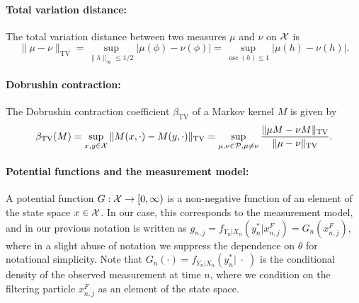 \paragraph{Total variation distance:} The total variation distance between two measures $\mu$ and $\nu$ on ${\mathcal{X}}$ is
\begin{equation}
\|\mu-\nu\|_{\mathrm{TV}}=\sup _{\|h\|_{\infty} \leq 1 / 2}|\mu(\phi)-\nu(\phi)|=\sup _{\operatorname{osc}(h) \leq 1}|\mu(h)-\nu(h)|.    
\end{equation}

\paragraph{Dobrushin contraction:} The Dobrushin contraction coefficient $\beta_{\text{TV}}$ of a Markov kernel $M$ is given by
\begin{equation}
\beta_{\mathrm{TV}}(M)=\sup _{x, y \in {\mathcal{X}}}\|M(x, \cdot)-M(y, \cdot)\|_{\mathrm{TV}}=\sup _{\mu, \nu \in \mathcal{P}, \mu \neq \nu} \frac{\|\mu M-\nu M\|_{\mathrm{TV}}}{\|\mu-\nu\|_{\mathrm{TV}}}.    
\end{equation}

\paragraph{Potential functions and the measurement model:} A potential function $G : {\mathcal{X}} \to [0,\infty)$ is a non-negative function of an element of the state space $x \in {\mathcal{X}}$. In our case, this corresponds to the measurement model, and in our previous notation is written as $g_{n,j} = f_{Y_n|X_n}(y_n^*|x_{n,j}^F) = G_n(x_{n,j}^F)$, where in a slight abuse of notation we suppress the dependence on $\theta$ for notational simplicity. Note that $G_n(\cdot) = f_{Y_n|X_n}(y_n^*|\;\cdot\;)$ is the conditional density of the observed measurement at time $n$, where we condition on the filtering particle $x_{n,j}^F$ as an element of the state space. 

